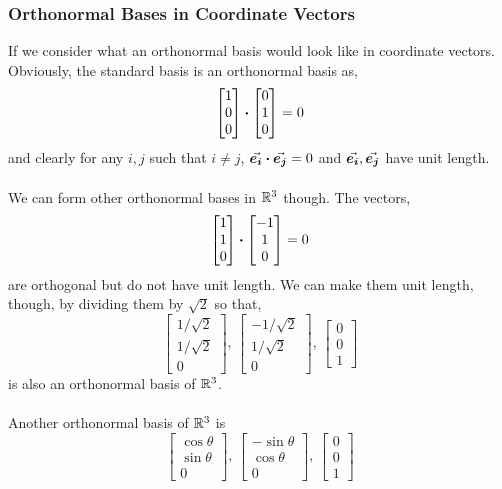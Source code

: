 \documentclass[MathsNotesBase.tex]{subfiles}
\begin{document}
{		\subsubsection{Orthonormal Bases in Coordinate Vectors} 
		If we consider what an orthonormal basis would look like in coordinate vectors. Obviously, the standard basis is an orthonormal basis as,
			\[ \begin{bmatrix}1\\0\\0\end{bmatrix} \boldsymbol{\cdot} \begin{bmatrix}0\\1\\0\end{bmatrix} = 0 \]
			and clearly for any ${ i,j }$ such that ${ i \neq j }$, ${ \vec{\bm{e_i}} \boldsymbol{\cdot} \vec{\bm{e_j}} = 0 }$ and ${\vec{\bm{e_i}}, \vec{\bm{e_j}} }$ have unit length.\\\\
			We can form other orthonormal bases in $\mathbb{R}^{3}$ though. The vectors,
			\[ \begin{bmatrix}1\\1\\0\end{bmatrix} \boldsymbol{\cdot} \begin{bmatrix}-1\\1\\0\end{bmatrix} = 0 \]
			are orthogonal but do not have unit length. We can make them unit length, though, by dividing them by $\sqrt{2}$ so that,
			\[ \begin{bmatrix}1/\sqrt{2}\\1/\sqrt{2}\\0\end{bmatrix},\, \begin{bmatrix}-1/\sqrt{2}\\1/\sqrt{2}\\0\end{bmatrix},\, \begin{bmatrix}0\\0\\1\end{bmatrix} \]
			is also an orthonormal basis of $\mathbb{R}^{3}$.\\\\
			Another orthonormal basis of $\mathbb{R}^{3}$ is
			\[ \begin{bmatrix}\cos\theta\\\sin\theta\\0\end{bmatrix},\, \begin{bmatrix}-\sin\theta\\\cos\theta\\0\end{bmatrix},\, \begin{bmatrix}0\\0\\1\end{bmatrix} \]
}
\end{document}
